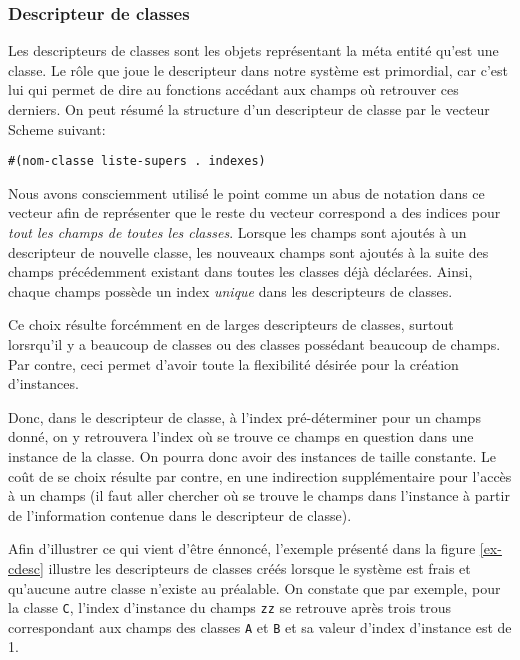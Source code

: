 \documentclass[letterpaper,12pt]{book}
\begin{document}
    \subsubsection{Descripteur de classes}
      Les descripteurs de classes sont les objets représentant la méta
      entité qu'est une classe. Le rôle que joue le descripteur dans
      notre système est primordial, car c'est lui qui permet de dire
      au fonctions accédant aux champs où retrouver ces derniers. On
      peut résumé la structure d'un descripteur de classe par le
      vecteur Scheme suivant:

      \begin{lstlisting}
#(nom-classe liste-supers . indexes)
      \end{lstlisting}

      Nous avons consciemment utilisé le point comme un abus de
      notation dans ce vecteur afin de représenter que le reste du
      vecteur correspond a des indices pour \emph{tout les champs de
        toutes les classes}. Lorsque les champs sont ajoutés à un
      descripteur de nouvelle classe, les nouveaux champs sont ajoutés
      à la suite des champs précédemment existant dans toutes les
      classes déjà déclarées. Ainsi, chaque champs possède un index
      \emph{unique} dans les descripteurs de classes.

      Ce choix résulte forcémment en de larges descripteurs de classes,
      surtout lorsrqu'il y a beaucoup de classes ou des classes
      possédant beaucoup de champs. Par contre, ceci permet d'avoir
      toute la flexibilité désirée pour la création d'instances. 

      Donc, dans le descripteur de classe, à l'index pré-déterminer pour
      un champs donné, on y retrouvera l'index où se trouve ce champs en
      question dans une instance de la classe. On pourra donc avoir des
      instances de taille constante. Le coût de se choix résulte par
      contre, en une indirection supplémentaire pour l'accès à un champs
      (il faut aller chercher où se trouve le champs dans l'instance à
      partir de l'information contenue dans le descripteur de classe).

      Afin d'illustrer ce qui vient d'être énnoncé, l'exemple présenté
      dans la figure \ref{ex-cdesc} illustre les descripteurs de classes
      créés lorsque le système est \og frais \fg et qu'aucune autre
      classe n'existe au préalable. On constate que par exemple, pour la
      classe \texttt{C}, l'index d'instance du champs \texttt{zz} se
      retrouve après trois \og trous \fg correspondant aux champs des
      classes \texttt{A} et \texttt{B} et sa valeur d'index d'instance
      est de 1.
\end{document}
